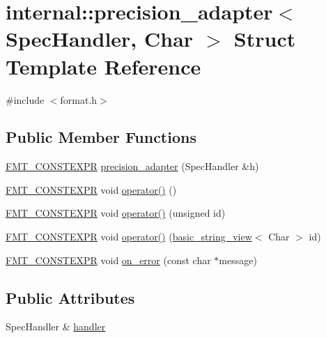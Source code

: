 \hypertarget{structinternal_1_1precision__adapter}{}\section{internal\+:\+:precision\+\_\+adapter$<$ Spec\+Handler, Char $>$ Struct Template Reference}
\label{structinternal_1_1precision__adapter}


{\ttfamily \#include $<$format.\+h$>$}

\subsection*{Public Member Functions}
\begin{DoxyCompactItemize}
\item 
\hyperlink{core_8h_a69201cb276383873487bf68b4ef8b4cd}{F\+M\+T\+\_\+\+C\+O\+N\+S\+T\+E\+X\+PR} \hyperlink{structinternal_1_1precision__adapter_ad860d39a96f65709f73e96e136d395aa}{precision\+\_\+adapter} (Spec\+Handler \&h)
\item 
\hyperlink{core_8h_a69201cb276383873487bf68b4ef8b4cd}{F\+M\+T\+\_\+\+C\+O\+N\+S\+T\+E\+X\+PR} void \hyperlink{structinternal_1_1precision__adapter_a63c4faa71c1b6bfa1555baa09a4669c7}{operator()} ()
\item 
\hyperlink{core_8h_a69201cb276383873487bf68b4ef8b4cd}{F\+M\+T\+\_\+\+C\+O\+N\+S\+T\+E\+X\+PR} void \hyperlink{structinternal_1_1precision__adapter_a6c0c03e7be98384394ab50d55fcbed42}{operator()} (unsigned id)
\item 
\hyperlink{core_8h_a69201cb276383873487bf68b4ef8b4cd}{F\+M\+T\+\_\+\+C\+O\+N\+S\+T\+E\+X\+PR} void \hyperlink{structinternal_1_1precision__adapter_a2c16675ac3d045776c3b3f4da1db5907}{operator()} (\hyperlink{classbasic__string__view}{basic\+\_\+string\+\_\+view}$<$ Char $>$ id)
\item 
\hyperlink{core_8h_a69201cb276383873487bf68b4ef8b4cd}{F\+M\+T\+\_\+\+C\+O\+N\+S\+T\+E\+X\+PR} void \hyperlink{structinternal_1_1precision__adapter_a463e2c71c294aaf98621085afb402294}{on\+\_\+error} (const char $\ast$message)
\end{DoxyCompactItemize}
\subsection*{Public Attributes}
\begin{DoxyCompactItemize}
\item 
Spec\+Handler \& \hyperlink{structinternal_1_1precision__adapter_ad82984ec771924019a6df49aff881f67}{handler}
\end{DoxyCompactItemize}


